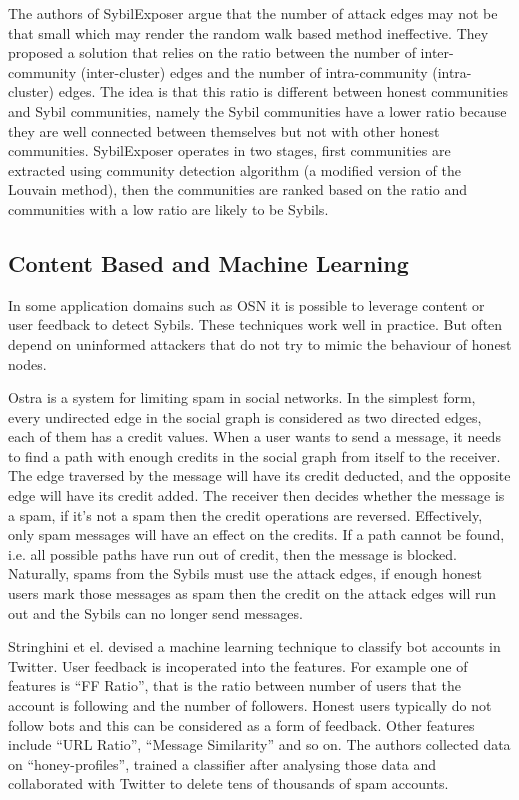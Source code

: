 The authors of SybilExposer\cite{misra2016sybilexposer} argue that the number of
attack edges may not be that small which may render the random walk based method
ineffective. They proposed a solution that relies on the ratio between the
number of inter-community (inter-cluster) edges and the number of
intra-community (intra-cluster) edges. The idea is that this ratio is different
between honest communities and Sybil communities, namely the Sybil communities have
a lower ratio because they are well connected between themselves but not with
other honest communities. SybilExposer operates in two stages, first communities
are extracted using community detection algorithm (a modified version of the
Louvain method\cite{blondel2008fast}), then the communities are ranked based on the
ratio and communities with a low ratio are likely to be Sybils.


\subsection{Content Based and Machine Learning}
In some application domains such as OSN it is possible to leverage content or
user feedback to detect Sybils. These techniques work well in practice. But
often depend on uninformed attackers that do not try to mimic the behaviour of
honest nodes.

Ostra\cite{mislove2008ostra} is a system for limiting spam in social networks.
In the simplest form, every undirected edge in the social graph is considered as
two directed edges, each of them has a credit values. When a user wants to send
a message, it needs to find a path with enough credits in the social graph from
itself to the receiver. The edge traversed by the message will have its credit
deducted, and the opposite edge will have its credit added. The receiver then
decides whether the message is a spam, if it's not a spam then the credit
operations are reversed. Effectively, only spam messages will have an effect on
the credits. If a path cannot be found, i.e. all possible paths have run out of
credit, then the message is blocked. Naturally, spams from the Sybils must use
the attack edges, if enough honest users mark those messages as spam then the
credit on the attack edges will run out and the Sybils can no longer send
messages.

Stringhini et el. devised a machine learning technique to classify bot accounts 
in Twitter\cite{stringhini2010detecting}. User feedback is incoperated into the
features. For example one of features is ``FF Ratio'', that is the ratio between
number of users that the account is following and the number of followers.
Honest users typically do not follow bots and this can be considered as a form
of feedback. Other features include ``URL Ratio'', ``Message Similarity'' and so
on. The authors collected data on ``honey-profiles'', trained a classifier after
analysing those data and collaborated with Twitter to delete tens of thousands
of spam accounts.

